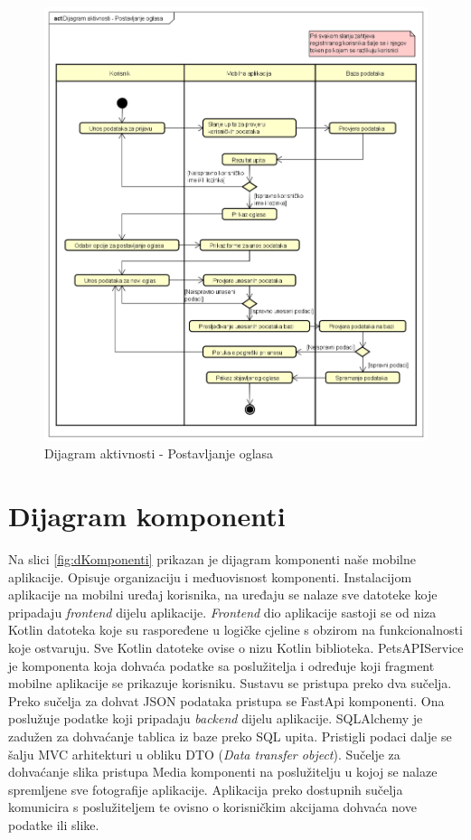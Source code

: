 			\begin{figure}[H]
				\includegraphics[scale=0.6]{dijagrami/dijagramAktivnosti/dAktivnosti.PNG} %
				\centering
				\caption{Dijagram aktivnosti - Postavljanje oglasa}
				\label{fig:dAktivnosti}
			\end{figure}
			
			\eject
		\section{Dijagram komponenti}
		
			Na slici \ref{fig:dKomponenti} prikazan je dijagram komponenti naše mobilne aplikacije.  Opisuje organizaciju i međuovisnost komponenti. Instalacijom aplikacije na mobilni uređaj korisnika, na uređaju se nalaze sve datoteke koje pripadaju \textit{frontend} dijelu aplikacije. \textit{Frontend} dio aplikacije sastoji se od niza Kotlin datoteka koje su raspoređene u logičke cjeline s obzirom na funkcionalnosti koje ostvaruju. Sve Kotlin datoteke ovise o nizu Kotlin biblioteka. PetsAPIService je komponenta koja dohvaća podatke sa poslužitelja i određuje koji fragment mobilne aplikacije se prikazuje korisniku. Sustavu se pristupa preko dva sučelja. Preko sučelja za dohvat JSON podataka pristupa se FastApi komponenti. Ona poslužuje podatke koji pripadaju \textit{backend} dijelu aplikacije. SQLAlchemy je zadužen za dohvaćanje tablica iz baze preko SQL upita. Pristigli podaci dalje se šalju MVC arhitekturi u obliku DTO (\textit{Data transfer object}). Sučelje za dohvaćanje slika pristupa Media komponenti na poslužitelju u kojoj se nalaze spremljene sve fotografije aplikacije. Aplikacija preko dostupnih sučelja komunicira s poslužiteljem te ovisno o korisničkim akcijama dohvaća nove podatke ili slike.

